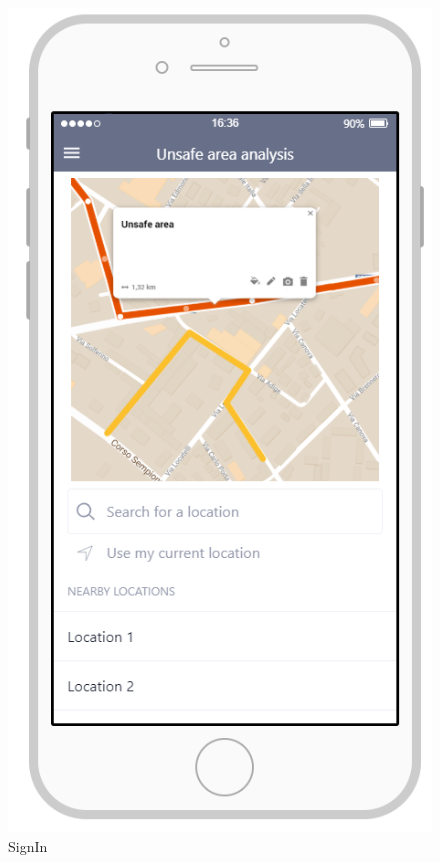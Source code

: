 \documentclass{article}
\begin{document}
\begin{figure}[H]
    \centering
    \includegraphics[scale=0.7]{Images/UnsafeAreaAnalysisAPP}
    \caption{SignIn}
\end{figure}
\end{document}
